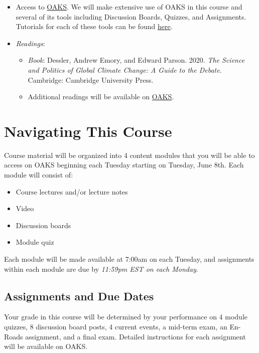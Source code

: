\begin{itemize}
\item
  Access to \href{https://lms.cofc.edu/d2l/login}{OAKS}. We will make
  extensive use of OAKS in this course and several of its tools
  including Discussion Boards, Quizzes, and Assignments. Tutorials for
  each of these tools can be found
  \href{https://blogs.cofc.edu/sits/tutorials/oaks_tutorials/}{here}.
\item
  \emph{Readings}:

  \begin{itemize}
  
  \item
    \emph{Book}: Dessler, Andrew Emory, and Edward Parson. 2020.
    \emph{The Science and Politics of Global Climate Change: A Guide to
    the Debate}. Cambridge: Cambridge University Press.
  \item
    Additional readings will be available on
    \href{https://lms.cofc.edu/d2l/login}{OAKS}.
  \end{itemize}
\end{itemize}

\hypertarget{navigating-this-course}{%
\section{Navigating This Course}\label{navigating-this-course}}

Course material will be organized into 4 content modules that you will
be able to access on OAKS beginning each Tuesday starting on Tuesday,
June 8th. Each module will consist of:

\begin{itemize}
\item
  Course lectures and/or lecture notes
\item
  Video
\item
  Discussion boards
\item
  Module quiz
\end{itemize}

Each module will be made available at 7:00am on each Tuesday, and
assignments within each module are due by \emph{11:59pm EST on each
Monday}.

\hypertarget{assignments-and-due-dates}{%
\subsection{Assignments and Due Dates}\label{assignments-and-due-dates}}

Your grade in this course will be determined by your performance on 4
module quizzes, 8 discussion board posts, 4 current events, a mid-term
exam, an En-Roads assignment, and a final exam. Detailed instructions
for each assignment will be available on OAKS.

